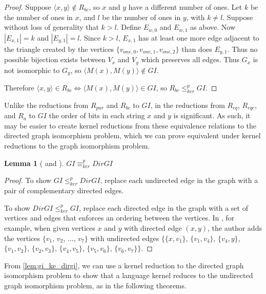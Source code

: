 \documentclass{article}
\newtheorem{lemma}[lemma]{Lemma}
\theoremstyle{definition} \newtheorem{definition}[definition]{Definition}
\newcommand{\kr}{\leq^{p}_{ker}} %
\newcommand{\kequiv}{\equiv^{p}_{ker}} %
\newcommand{\pair}[2]{\langle#1,#2\rangle} %
\begin{document}
\begin{proof}
  Suppose $\pair{x}{y}\notin R_{bc}$, so $x$ and $y$ have a different number of
  ones. Let $k$ be the number of ones in $x$, and $l$ be the number of ones in
  $y$, with $k\neq l$. Suppose without loss of generality that $k>l$. Define
  $E_{w,0}$ and $E_{w,1}$ as above. Now $|E_{x,1}|=k$ and $|E_{y,1}|=l$. Since
  $k>l$, $E_{x,1}$ has at least one more edge adjacent to the triangle created
  by the vertices $\{v_{one,0},v_{one,1},v_{one,2}\}$ than does $E_{y,1}$. Thus
  no possible bijection exists between $V_x$ and $V_y$ which preserves all
  edges. Thus $G_x$ is not isomorphic to $G_y$, so $\pair{M(x)}{M(y)}\notin
  GI$.

  Therefore $\pair{x}{y}\in R_{bc} \iff \pair{M(x)}{M(y)}\in GI$, so $R_{bc}\kr
  GI$.
\end{proof}

Unlike the reductions from $R_{par}$ and $R_{bc}$ to $GI$, in the reductions
from $R_{eq}$, $R_{eqc}$, and $R_a$ to $GI$ the order of bits in each string
$x$ and $y$ is significant. As such, it may be easier to create kernel
reductions from these equivalence relations to the directed graph isomorphism
problem, which we can prove equivalent under kernel reductions to the graph
isomorphism problem. 

\begin{lemma}[\cite{kst93} and \cite{miller77}]\label{lem:gi_ke_dirgi}
  $GI\kequiv DirGI$
\end{lemma}
\begin{proof}
  To show $GI\kr DirGI$, replace each undirected edge in the graph with a pair
  of complementary directed edges.
  
  To show $DirGI\kr GI$, replace each directed edge in the graph with a set of
  vertices and edges that enforces an ordering between the vertices. In
  \cite{miller77}, for example, when given vertices $x$ and $y$ with directed
  edge $(x,y)$, the author adds the vertices $\{v_1$, $v_2$, $\ldots$, $v_7\}$
  with undirected edges $\{\{x, v_1\}$, $\{v_1,v_4\}$, $\{v_4,y\}$,
  $\{v_1,v_2\}$, $\{v_2,v_3\}$, $\{v_4,v_5\}$, $\{v_5,v_6\}$, $\{v_6,v_7\}\}$.
\end{proof}

From \autoref{lem:gi_ke_dirgi}, we can use a kernel reduction to the directed
graph isomorphism problem to show that a language kernel reduces to the
undirected graph isomorphism problem, as in the following theorems.
\end{document}
